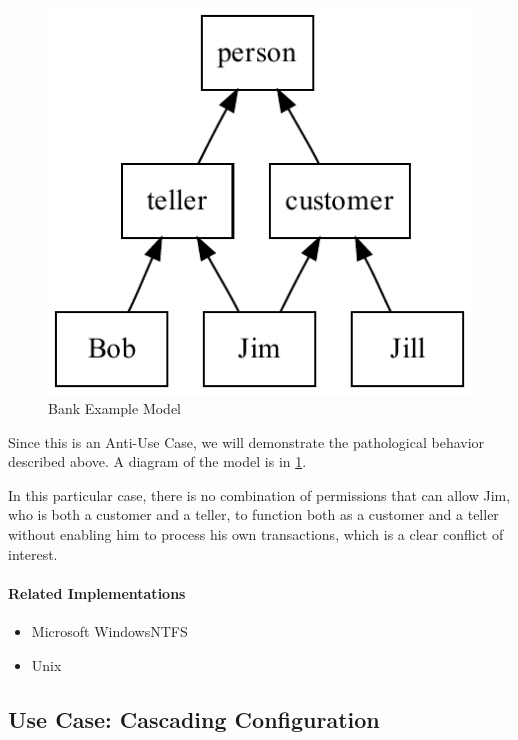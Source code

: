 \begin{figure}[t]
	\begin{center}\includegraphics[width=\myfigwidth,height=\myfigheight,keepaspectratio]{figs/dot/bank_model}\end{center}
	\caption{Bank Example Model}\label{fig:perm-flat}
\end{figure}

Since this is an Anti-Use Case, we will demonstrate the pathological behavior described above.  A diagram of the model is in \ref{fig:perm-flat}.

In this particular case, there is no combination of permissions that can allow Jim, who is both a customer and a teller, to function both as a customer and a teller without enabling him to process his own transactions, which is a clear conflict of interest.

\paragraph{Related Implementations}

\begin{itemize}
	\item Microsoft Windows\texttrademark NTFS
	\item Unix\texttrademark{}
\end{itemize}

\subsection{Use Case: Cascading Configuration}

